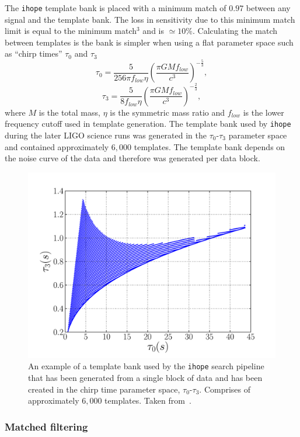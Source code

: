 The \texttt{ihope} template bank is placed with a minimum match of $0.97$ between any signal and the template bank. The loss in sensitivity due to this minimum match limit is equal to the minimum match$^{3}$ and is $\simeq 10\%$. Calculating the match between templates is the bank is simpler when using a flat parameter space such as ``chirp times'' $\tau_{0}$ and $\tau_{3}$~\cite{Droz:1999}
%
\begin{equation}
    \tau_{0} = \frac{5}{256\pi f_{low}\eta}\left(\frac{\pi G M f_{low}}{c^{3}}\right)^{-\frac{5}{3}},
\end{equation}
%
\begin{equation}
    \tau_{3} = \frac{5}{8 f_{low}\eta}\left(\frac{\pi G M f_{low}}{c^{3}}\right)^{-\frac{2}{3}},
\end{equation}
%
where $M$ is the total mass, $\eta$ is the symmetric mass ratio and $f_{low}$ is the lower frequency cutoff used in template generation. The template bank used by \texttt{ihope} during the later LIGO science runs was generated in the $\tau_{0}$-$\tau_{3}$ parameter space and contained approximately $6,000$ templates. The template bank depends on the noise curve of the data and therefore was generated per data block.
%
\begin{figure}
    \centering
    \includegraphics[width=0.75\linewidth]{images/2_searches/ihope_template_bank.pdf}
    \caption{An example of a template bank used by the \texttt{ihope} search pipeline that has been generated from a single block of data and has been created in the chirp time parameter space, $\tau_{0}$-$\tau_{3}$. Comprises of approximately $6,000$ templates. Taken from~\cite{IHOPE:2012zx}.}
    \label{2:fig:ihope-template-bank}
\end{figure}
%

\subsubsection{Matched filtering}

